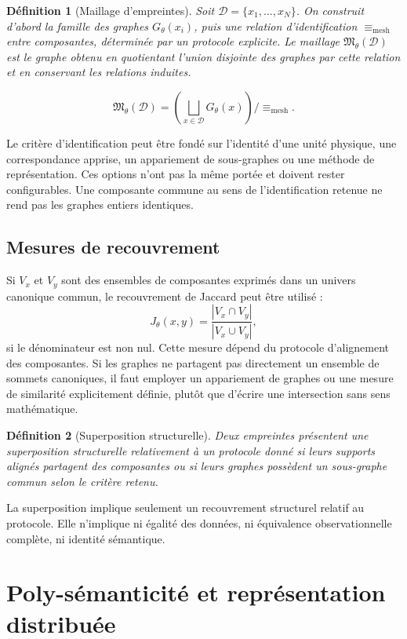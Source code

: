 \documentclass[11pt,a4paper]{article}
\newtheorem{definition}{Définition}[section]
\theoremstyle{remark}
\newcommand{\D}{\mathcal D}
\newcommand{\1}{\mathbf 1}
\begin{document}
\begin{definition}[Maillage d'empreintes]
Soit $\D=\{x_1,\ldots,x_N\}$. On construit d'abord la famille des graphes $G_\theta(x_i)$, puis une relation d'identification $\equiv_{\mathrm{mesh}}$ entre composantes, déterminée par un protocole explicite. Le maillage $\mathfrak M_\theta(\D)$ est le graphe obtenu en quotientant l'union disjointe des graphes par cette relation et en conservant les relations induites.
\end{definition}

\[
\mathfrak M_\theta(\D)=\left(\bigsqcup_{x\in\D}G_\theta(x)\right)\!/\!\equiv_{\mathrm{mesh}}.
\]

Le critère d'identification peut être fondé sur l'identité d'une unité physique, une correspondance apprise, un appariement de sous-graphes ou une méthode de représentation. Ces options n'ont pas la même portée et doivent rester configurables. Une composante commune au sens de l'identification retenue ne rend pas les graphes entiers identiques.

\subsection{Mesures de recouvrement}
Si $V_x$ et $V_y$ sont des ensembles de composantes exprimés dans un univers canonique commun, le recouvrement de Jaccard peut être utilisé :
\[
J_\theta(x,y)=\frac{|V_x\cap V_y|}{|V_x\cup V_y|},
\]
si le dénominateur est non nul. Cette mesure dépend du protocole d'alignement des composantes. Si les graphes ne partagent pas directement un ensemble de sommets canoniques, il faut employer un appariement de graphes ou une mesure de similarité explicitement définie, plutôt que d'écrire une intersection sans sens mathématique.

\begin{definition}[Superposition structurelle]
Deux empreintes présentent une superposition structurelle relativement à un protocole donné si leurs supports alignés partagent des composantes ou si leurs graphes possèdent un sous-graphe commun selon le critère retenu.
\end{definition}

La superposition implique seulement un recouvrement structurel relatif au protocole. Elle n'implique ni égalité des données, ni équivalence observationnelle complète, ni identité sémantique.

\section{Poly-sémanticité et représentation distribuée}
\end{document}
